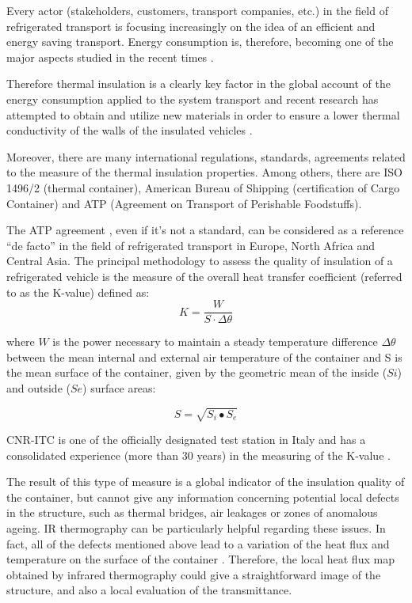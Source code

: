 Every actor (stakeholders, customers, transport companies, etc.) in the field of refrigerated transport is focusing increasingly on the idea of an efficient and energy saving transport. Energy consumption is, therefore, becoming one of the major aspects studied in the recent times \citet{Tassou2009,Cavalier2010,Adekomaya2017}. 

Therefore thermal insulation is a clearly key factor in the global account of the energy consumption applied to the system transport and recent research has attempted to obtain and utilize new materials in order to ensure a lower thermal conductivity of the walls of the insulated vehicles \citet{Tinti2014,Lawton2016}.

Moreover, there are many international regulations, standards, agreements related to the measure of the thermal insulation properties. Among others, there are ISO 1496/2 (thermal container), American Bureau of Shipping (certification of Cargo Container) and ATP (Agreement on Transport of Perishable Foodstuffs).

The ATP agreement \citet{Geneva1970}, even if it’s not a standard, can be considered as a reference “de facto” in the field of refrigerated transport in Europe, North Africa and Central Asia. The principal methodology to assess the quality of insulation of a refrigerated vehicle is the measure of the overall heat transfer coefficient (referred to as the K-value) defined as:
\begin{equation}
K=\frac{W}{S⋅\Delta \theta}
\end{equation}


where $ W $ is the power necessary to maintain a steady temperature difference $ \Delta \theta $ between the mean internal and external air temperature of the container and S is the mean surface of the container, given by the geometric mean of the inside ($ Si $) and outside ($ Se $) surface areas:

\begin{equation}
S=\sqrt{S_i∙S_e}
\end{equation}

CNR-ITC is one of the officially designated test station in Italy and has a consolidated experience (more than 30 years) in the measuring of the K-value \citet{rossi2009k}.

The result of this type of measure is a global indicator of the insulation quality of the container, but cannot give any information concerning potential local defects in the structure, such as thermal bridges, air leakages or zones of anomalous ageing. IR thermography can be particularly helpful regarding these issues. In fact, all of the defects mentioned above lead to a variation of the heat flux and temperature on the surface of the container \citet{grinzato2010r, grinzatoquality, grinzato1comparison}. Therefore, the local heat flux map obtained by infrared thermography could give a straightforward image of the structure, and also a local evaluation of the transmittance.

